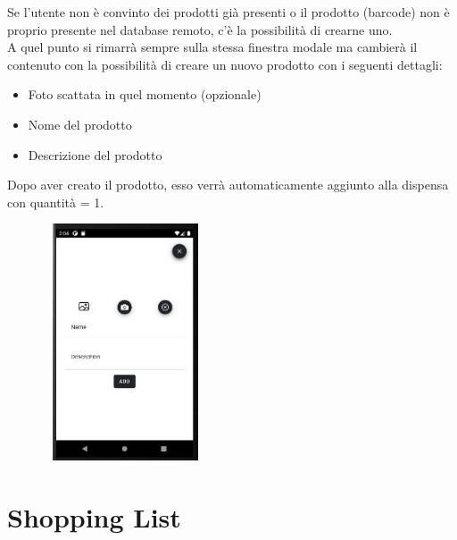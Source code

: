 \documentclass[11pt]{article}
\begin{document}
\begin{multicols}{2}
\begin{flushleft}
Se l'utente non è convinto dei prodotti già presenti o il prodotto (barcode) non è  proprio presente nel database remoto, c'è la possibilità di crearne uno.\\
A quel punto si rimarrà sempre sulla stessa finestra modale ma cambierà il contenuto con la possibilità di creare un nuovo prodotto con i seguenti dettagli:
\begin{itemize}
\item Foto scattata in quel momento (opzionale)
\item Nome del prodotto
\item Descrizione del prodotto
\end{itemize}
Dopo aver creato il prodotto, esso verrà automaticamente aggiunto alla dispensa con quantità = 1.
\null \vfill
\end{flushleft}

\columnbreak

\begin{flushright}

\includegraphics[width=7cm,height=7cm,keepaspectratio]{NewProduct}
\null \vfill
\end{flushright}
\end{multicols}

\newpage


\section{Shopping List}
\end{document}
